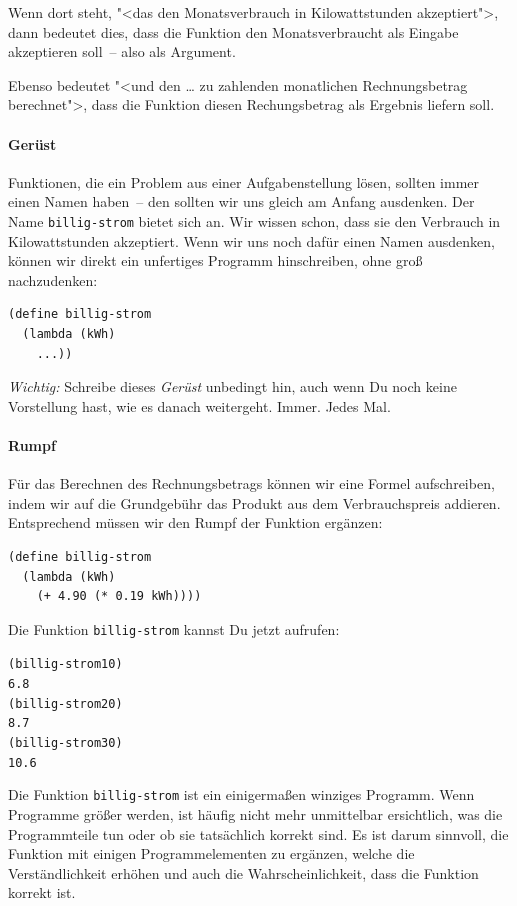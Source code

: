 Wenn dort steht, "<das den Monatsverbrauch in Kilowattstunden
akzeptiert">, dann bedeutet dies, dass die Funktion den
Monatsverbraucht als Eingabe akzeptieren soll~-- also als Argument.

Ebenso bedeutet "<und den \ldots{} zu zahlenden monatlichen
Rechnungsbetrag berechnet">, dass die Funktion diesen Rechungsbetrag
als Ergebnis liefern soll.

\paragraph{Gerüst}

Funktionen, die ein Problem aus einer Aufgabenstellung lösen, sollten
immer einen Namen haben~-- den sollten wir uns gleich am Anfang
ausdenken.  Der Name \texttt{billig-strom} bietet sich an.  Wir wissen
schon, dass sie den Verbrauch in Kilowattstunden akzeptiert.  Wenn wir
uns noch dafür einen Namen ausdenken, können wir direkt ein unfertiges
Programm hinschreiben, ohne groß nachzudenken:
%
\begin{verbatim}
(define billig-strom
  (lambda (kWh)
    ...))
\end{verbatim}
%
\emph{Wichtig:} Schreibe dieses \textit{Gerüst}
unbedingt hin, auch wenn Du noch keine Vorstellung hast, wie es danach
weitergeht.  Immer.  Jedes Mal.

\paragraph{Rumpf}

Für das Berechnen des Rechnungsbetrags können wir eine Formel
aufschreiben, indem wir auf die Grundgebühr das Produkt aus dem
Verbrauchspreis addieren.  Entsprechend müssen wir den Rumpf der
Funktion ergänzen:
%
\begin{verbatim}
(define billig-strom
  (lambda (kWh)
    (+ 4.90 (* 0.19 kWh))))
\end{verbatim}
%
Die Funktion \texttt{billig-strom} kannst Du jetzt aufrufen:
%
\begin{alltt}
(billig-strom 10)
\evalsto{} 6.8
(billig-strom 20)
\evalsto{} 8.7
(billig-strom 30)
\evalsto{} 10.6
\end{alltt}
%
Die Funktion \texttt{billig-strom} ist ein einigermaßen winziges
Programm.  Wenn Programme größer werden, ist häufig nicht mehr
unmittelbar ersichtlich, was die Programmteile tun oder ob sie
tatsächlich korrekt sind.  Es ist darum sinnvoll, die Funktion mit
einigen Programmelementen zu ergänzen, welche die Verständlichkeit
erhöhen und auch die Wahrscheinlichkeit, dass die Funktion korrekt
ist.

